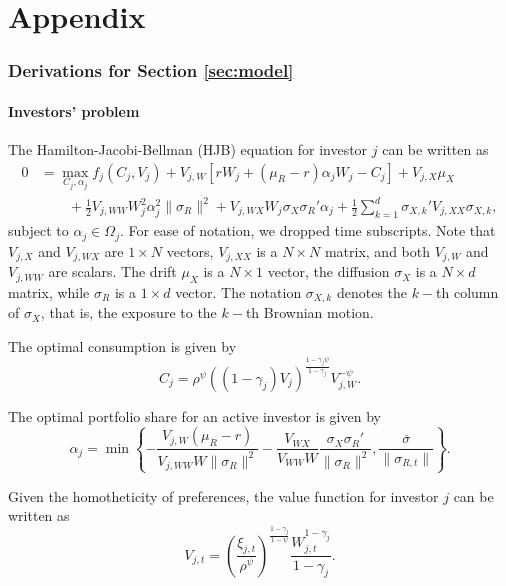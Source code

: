 \appendix
\onehalfspacing
\part*{Appendix}\label{appendix}

\section{Derivations for Section \ref{sec:model}}

\subsection{Investors' problem}

The Hamilton-Jacobi-Bellman (HJB) equation for investor $j$ can be written as
\begin{align}
    0 &= \max_{C_j, \alpha_j} f_j(C_j,V_j) + V_{j,W}\left[ r W_j + (\mu_R-r) \alpha_j W_j  - C_j\right] +V_{j,X} \mu_X\nonumber\\
    &\qquad + \frac{1}{2} V_{j,WW} W_j^2 \alpha_j^2 \|\sigma_R\|^2 + V_{j,WX}W_j \sigma_X \sigma_R' \alpha_j    + \frac{1}{2} \sum_{k=1}^d \sigma_{X,k}' V_{j,XX} \sigma_{X,k},
\end{align}
subject to $\alpha_j \in \Omega_j$. For ease of notation, we dropped time subscripts. Note that  $V_{j,X}$ and $V_{j,WX}$ are $1\times N$ vectors, $V_{j,XX}$ is a $N\times N$ matrix, and both $V_{j,W}$ and $V_{j,WW}$ are scalars. The drift $\mu_X$ is a $N\times 1$ vector, the diffusion $\sigma_X$ is a $N\times d$ matrix, while $\sigma_R$ is a $1\times d$ vector. The notation $\sigma_{X,k}$ denotes the $k-$th column of $\sigma_{X}$, that is, the exposure to the $k-$th Brownian motion.

The optimal consumption is given by
\begin{equation}
 C_j = \rho^\psi ((1-\gamma_j) V_j)^{\frac{1-\gamma_j\psi }{1-\gamma_j}}V_{j,W}^{-\psi}.
\end{equation}

The optimal portfolio share for an active investor is given by
\begin{equation}
\alpha_j = \min \left\{ -\frac{V_{j,W} (\mu_R-r)}{V_{j,WW} W \|\sigma_R\|^2}   - \frac{V_{WX}}{V_{WW} W} \frac{\sigma_X \sigma_R'}{\|\sigma_R\|^2}, \frac{\overline{\sigma}}{\|\sigma_{R,t}\|} \right\}.
\end{equation}

Given the homotheticity of preferences, the value function for investor $j$ can be written as
\begin{equation}\label{app:value_function}
    V_{j,t} = \left(\frac{\xi_{j,t}}{\rho^\psi}\right)^{\frac{1-\gamma_j}{1-\psi}} \frac{W_{j,t}^{1-\gamma_j}}{1-\gamma_j}.
\end{equation}

